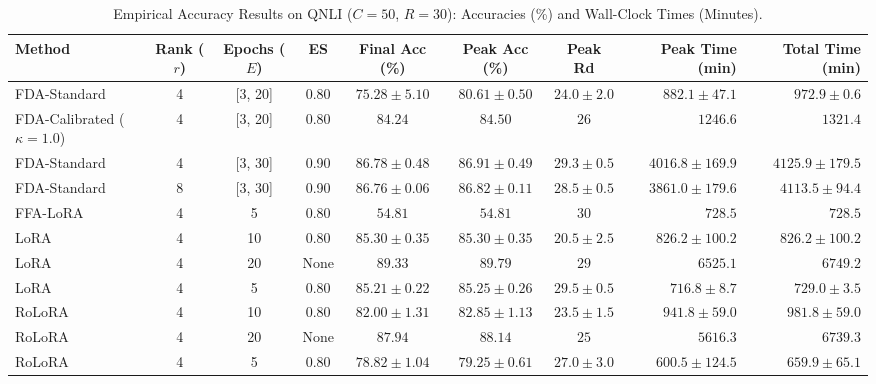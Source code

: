 \documentclass[10pt,a4paper]{article}
\begin{document}
\begin{table}[H]
\centering
\caption{Empirical Accuracy Results on QNLI ($C=50$, $R=30$): Accuracies (\%) and Wall-Clock Times (Minutes).}
\scriptsize
\setlength{\tabcolsep}{3.5pt}
\begin{tabular*}{\textwidth}{@{\extracolsep{\fill}}lccccccrr@{}}
\toprule
\textbf{Method} & \textbf{Rank ($r$)} & \textbf{Epochs ($E$)} & \textbf{ES} & \textbf{Final Acc (\%)} & \textbf{Peak Acc (\%)} & \textbf{Peak Rd} & \textbf{Peak Time (min)} & \textbf{Total Time (min)} \\
\midrule
FDA-Standard & 4 & [3, 20] & 0.80 & $75.28 \pm 5.10$ & $80.61 \pm 0.50$ & $24.0 \pm 2.0$ & $882.1 \pm 47.1$ & $972.9 \pm 0.6$ \\
FDA-Calibrated ($\kappa=1.0$) & 4 & [3, 20] & 0.80 & $84.24$ & $84.50$ & $26$ & $1246.6$ & $1321.4$ \\
FDA-Standard & 4 & [3, 30] & 0.90 & $86.78 \pm 0.48$ & $86.91 \pm 0.49$ & $29.3 \pm 0.5$ & $4016.8 \pm 169.9$ & $4125.9 \pm 179.5$ \\
FDA-Standard & 8 & [3, 30] & 0.90 & $86.76 \pm 0.06$ & $86.82 \pm 0.11$ & $28.5 \pm 0.5$ & $3861.0 \pm 179.6$ & $4113.5 \pm 94.4$ \\
FFA-LoRA & 4 & 5 & 0.80 & $54.81$ & $54.81$ & $30$ & $728.5$ & $728.5$ \\
LoRA & 4 & 10 & 0.80 & $85.30 \pm 0.35$ & $85.30 \pm 0.35$ & $20.5 \pm 2.5$ & $826.2 \pm 100.2$ & $826.2 \pm 100.2$ \\
LoRA & 4 & 20 & None & $\mathbf{89.33}$ & $\mathbf{89.79}$ & $29$ & $6525.1$ & $6749.2$ \\
LoRA & 4 & 5 & 0.80 & $85.21 \pm 0.22$ & $85.25 \pm 0.26$ & $29.5 \pm 0.5$ & $716.8 \pm 8.7$ & $729.0 \pm 3.5$ \\
RoLoRA & 4 & 10 & 0.80 & $82.00 \pm 1.31$ & $82.85 \pm 1.13$ & $23.5 \pm 1.5$ & $941.8 \pm 59.0$ & $981.8 \pm 59.0$ \\
RoLoRA & 4 & 20 & None & $87.94$ & $88.14$ & $25$ & $5616.3$ & $6739.3$ \\
RoLoRA & 4 & 5 & 0.80 & $78.82 \pm 1.04$ & $79.25 \pm 0.61$ & $27.0 \pm 3.0$ & $\mathbf{600.5 \pm 124.5}$ & $659.9 \pm 65.1$ \\
\bottomrule
\end{tabular*}
\end{table}
\end{document}
